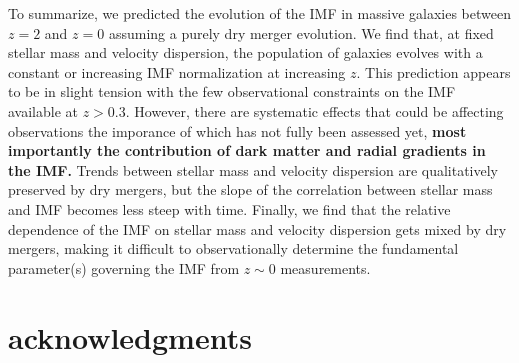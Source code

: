 \documentclass[usenatbib, letters]{mnras}
\begin{document}
To summarize, we predicted the evolution of the IMF in massive galaxies between $z=2$ and $z=0$ assuming a purely dry merger evolution.
We find that, at fixed stellar mass and velocity dispersion, the population of galaxies evolves with a constant or increasing IMF normalization at increasing $z$.
This prediction appears to be in slight tension with the few observational constraints on the IMF available at $z>0.3$. However, there are systematic effects that could be affecting observations the imporance of which has not fully been assessed yet, {\bf most importantly the contribution of dark matter and radial gradients in the IMF.}
Trends between stellar mass and velocity dispersion are qualitatively preserved by dry mergers, but the slope of the correlation between stellar mass and IMF becomes less steep with time.
Finally, we find that the relative dependence of the IMF on stellar mass and velocity dispersion gets mixed by dry mergers, making it difficult to observationally determine the fundamental parameter(s) governing the IMF from $z\sim0$ measurements.




\section*{acknowledgments}


%





\appendix
\end{document}
